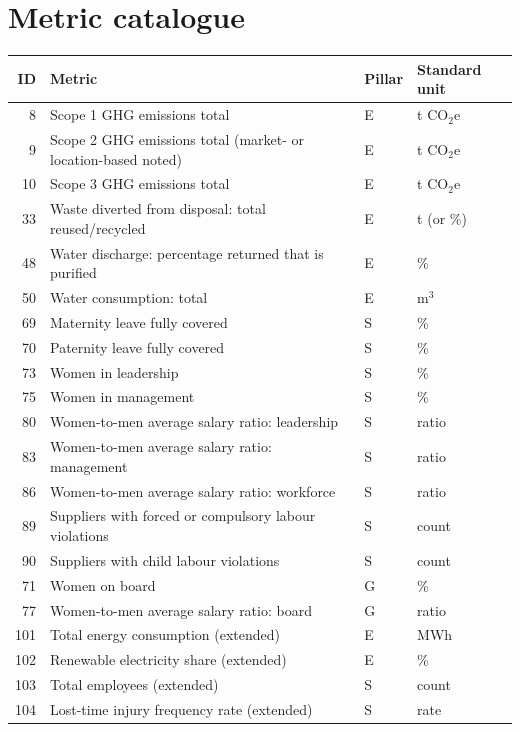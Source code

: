 \documentclass[11pt,a4paper]{article}
\begin{document}
\section{Metric catalogue}
\begin{longtable}{@{}rlll@{}}
\toprule
\textbf{ID} & \textbf{Metric} & \textbf{Pillar} & \textbf{Standard unit}\\\midrule\endhead
8 & Scope 1 GHG emissions total & E & t CO$_2$e\\
9 & Scope 2 GHG emissions total (market- or location-based noted) & E & t CO$_2$e\\
10 & Scope 3 GHG emissions total & E & t CO$_2$e\\
33 & Waste diverted from disposal: total reused/recycled & E & t (or \%)\\
48 & Water discharge: percentage returned that is purified & E & \%\\
50 & Water consumption: total & E & m$^3$\\
69 & Maternity leave fully covered & S & \%\\
70 & Paternity leave fully covered & S & \%\\
73 & Women in leadership & S & \%\\
75 & Women in management & S & \%\\
80 & Women-to-men average salary ratio: leadership & S & ratio\\
83 & Women-to-men average salary ratio: management & S & ratio\\
86 & Women-to-men average salary ratio: workforce & S & ratio\\
89 & Suppliers with forced or compulsory labour violations & S & count\\
90 & Suppliers with child labour violations & S & count\\
71 & Women on board & G & \%\\
77 & Women-to-men average salary ratio: board & G & ratio\\\midrule
101 & Total energy consumption (extended) & E & MWh\\
102 & Renewable electricity share (extended) & E & \%\\
103 & Total employees (extended) & S & count\\
104 & Lost-time injury frequency rate (extended) & S & rate\\
\bottomrule
\end{longtable}
\end{document}
